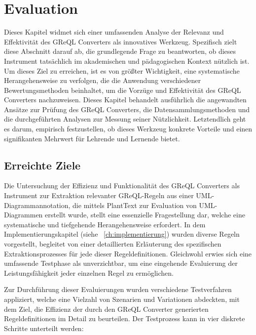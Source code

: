 \chapter{Evaluation}

Dieses Kapitel widmet sich einer umfassenden Analyse der Relevanz und Effektivität des GReQL Converters als innovatives
Werkzeug. Spezifisch zielt diese Abschnitt darauf ab, die grundlegende Frage zu beantworten, ob dieses Instrument
tatsächlich im akademischen und pädagogischen Kontext nützlich ist. Um dieses Ziel zu erreichen, ist es von größter
Wichtigkeit, eine systematische Herangehensweise zu verfolgen, die die Anwendung verschiedener Bewertungsmethoden
beinhaltet, um die Vorzüge und Effektivität des GReQL Converters nachzuweisen. Dieses Kapitel behandelt ausführlich die
angewandten Ansätze zur Prüfung des GReQL Converters, die Datensammlungsmethoden und die durchgeführten Analysen zur
Messung seiner Nützlichkeit. Letztendlich geht es darum, empirisch festzustellen, ob dieses Werkzeug konkrete Vorteile
und einen signifikanten Mehrwert für Lehrende und Lernende bietet.

\section{Erreichte Ziele}

Die Untersuchung der Effizienz und Funktionalität des GReQL Converters als Instrument zur Extraktion relevanter
GReQL-Regeln aus einer UML-Diagrammannotation, die mittels PlantText zur Evaluation von UML-Diagrammen erstellt wurde,
stellt eine essenzielle Fragestellung dar, welche eine systematische und tiefgehende Herangehensweise erfordert. In dem
Implementierungskapitel (siehe ~\ref{ch:implementierung}) wurden diverse Regeln vorgestellt, begleitet von einer detaillierten Erläuterung des
spezifischen Extraktionsprozesses für jede dieser Regeldefinitionen. Gleichwohl erwies sich eine umfassende Testphase
als unverzichtbar, um eine eingehende Evaluierung der Leistungsfähigkeit jeder einzelnen Regel zu ermöglichen.

Zur Durchführung dieser Evaluierungen wurden verschiedene Testverfahren appliziert, welche eine Vielzahl von Szenarien
und Variationen abdeckten, mit dem Ziel, die Effizienz der durch den GReQL Converter generierten Regeldefinitionen
im Detail zu beurteilen. Der Testprozess kann in vier diskrete Schritte unterteilt werden:

